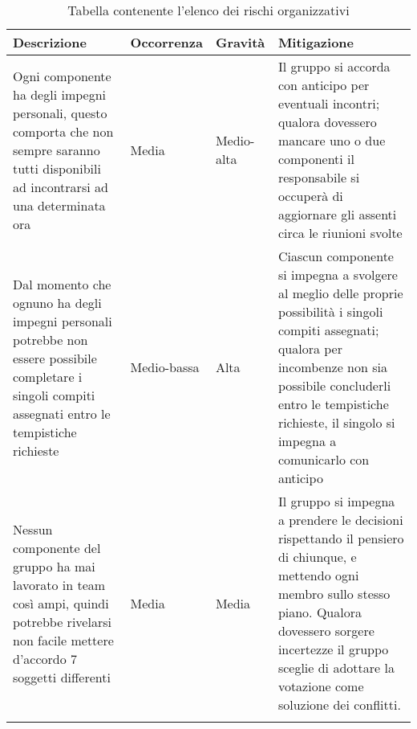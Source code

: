 \documentclass[../piano_di_progetto.tex]{subfiles}
\begin{document}
\begin{center}
	\begin{longtable}{| p{3.5cm} | p{2cm}|p{2cm}|p{3.5cm}|}
		\hline
		\rowcolor{lightgray}
		{\textbf{Descrizione}} & {\textbf{Occorrenza}} & {\textbf{Gravità}} & {\textbf{Mitigazione}} \\

		\hline
			Ogni componente ha degli impegni personali, questo comporta che non sempre saranno tutti disponibili ad incontrarsi ad una determinata ora
			&
			Media
			& 
			Medio-alta
			&
			Il gruppo si accorda con anticipo per eventuali incontri; qualora dovessero mancare uno o due componenti il responsabile si occuperà di aggiornare gli assenti circa le riunioni svolte \\	
			\hline
			Dal momento che ognuno ha degli impegni personali potrebbe non essere possibile completare i singoli compiti assegnati entro le tempistiche richieste
			&
			Medio-bassa
			& 
			Alta
			& 
			Ciascun componente si impegna a svolgere al meglio delle proprie possibilità i singoli compiti assegnati; qualora per incombenze non sia possibile concluderli entro le tempistiche richieste, il singolo si impegna a comunicarlo con anticipo\\
			\hline
			Nessun componente del gruppo ha mai lavorato in team così ampi, quindi potrebbe rivelarsi non facile mettere d’accordo 7 soggetti differenti
			&
			Media
			&
			Media
			&
			Il gruppo si impegna a prendere le decisioni rispettando il pensiero di chiunque, e mettendo ogni membro sullo stesso piano. Qualora dovessero sorgere incertezze il gruppo sceglie di adottare la votazione come soluzione dei conflitti. \\
\hline
\rowcolor{white}
\caption{Tabella contenente l'elenco dei rischi organizzativi}
	\end{longtable}

\end{center}
\end{document}
